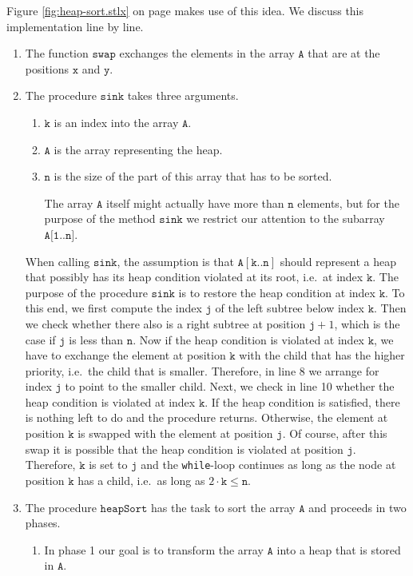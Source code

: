 Figure \ref{fig:heap-sort.stlx} on page \pageref{fig:Heap.ipynb:heap_sort} makes use of this idea.
We discuss this implementation line by line.
\begin{enumerate}
\item The function $\texttt{swap}$ exchanges the elements in the array $\texttt{A}$ that are at the
      positions $\texttt{x}$ and $\texttt{y}$.
\item The procedure $\texttt{sink}$ takes three arguments.
      \begin{enumerate}
      \item $\texttt{k}$ is an index into the array $\texttt{A}$.
      \item $\texttt{A}$ is the array representing the heap.
      \item $\texttt{n}$ is the size of the part of this array that has to be sorted.  

            The array $\texttt{A}$ itself might actually have more than $\texttt{n}$ elements, but for the
            purpose of the method $\texttt{sink}$ we restrict our attention to the subarray
            $\texttt{A[1..n]}$. 
      \end{enumerate}
      When calling $\texttt{sink}$, the assumption is that $\texttt{A}[\texttt{k..n}]$ should represent a heap 
      that possibly has its heap condition violated at its root, i.e.~at index $\texttt{k}$.  The
      purpose of the procedure $\texttt{sink}$ is to restore the heap condition at index $\texttt{k}$.
      To this end, we first compute the index $\texttt{j}$ of the left subtree below index $\texttt{k}$.
      Then we check whether there also is a right subtree at position $\texttt{j}+1$, which is the
      case if $\texttt{j}$ is less than $\texttt{n}$.  Now if the heap condition is violated at index
      $\texttt{k}$, we have to exchange the element at  position $\texttt{k}$ with the child that has
      the higher priority, i.e.~the child that is smaller. Therefore, in line 8 we arrange for index
      $\texttt{j}$ to point to the smaller child.  Next, we check in line 10 whether the heap
      condition is violated at index $\texttt{k}$.  If the heap condition is satisfied, there is
      nothing left to do and the procedure returns.  Otherwise, the element at position $\texttt{k}$ is swapped with
      the element at position $\texttt{j}$.  Of course, after this swap it is possible that the heap condition is
      violated at position $\texttt{j}$.  Therefore,  $\texttt{k}$ is set to $\texttt{j}$ and the \texttt{while}-loop continues
      as long as the node at position $\texttt{k}$ has a child, i.e.~as long as 
      $2 \cdot \texttt{k}\leq \texttt{n}$.
\item The procedure $\texttt{heapSort}$ has the task to sort the array $\texttt{A}$ and proceeds in two phases.
      \begin{enumerate}
      \item In phase 1 our goal is to transform the array $\texttt{A}$ into a heap that is stored in $\texttt{A}$.


\end{enumerate}
\end{enumerate}
